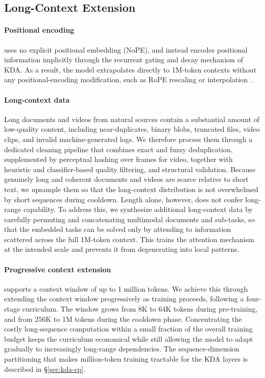 \subsection{Long-Context Extension}


\paragraph{Positional encoding}
 uses no explicit positional embedding (NoPE), and instead encodes positional information implicitly through the recurrent gating and decay mechanism of KDA.
As a result, the model extrapolates directly to 1M-token contexts without any positional-encoding modification, such as RoPE rescaling or interpolation~\citep{peng2023yarn}.

\paragraph{Long-context data}
Long documents and videos from natural sources contain a substantial amount of low-quality content, including near-duplicates, binary blobs, truncated files, video clips, and invalid machine-generated logs.
We therefore process them through a dedicated cleaning pipeline that combines exact and fuzzy deduplication, supplemented by perceptual hashing over frames for video, together with heuristic and classifier-based quality filtering, and structural validation.
Because genuinely long and coherent documents and videos are scarce relative to short text, we upsample them so that the long-context distribution is not overwhelmed by short sequences during cooldown. 
Length alone, however, does not confer long-range capability.
To address this, we synthesize additional long-context data by carefully permuting and concatenating multimodal documents and sub-tasks, so that the embedded tasks can be solved only by attending to information scattered across the full 1M-token context.
This trains the attention mechanism at the intended scale and prevents it from degenerating into local patterns.


\paragraph{Progressive context extension}
 supports a context window of up to 1 million tokens.
We achieve this through extending the context window progressively as training proceeds, following a four-stage curriculum.
The window grows from 8K to 64K tokens during pre-training, and from 256K to 1M tokens during the cooldown phase.
Concentrating the costly long-sequence computation within a small fraction of the overall training budget keeps the curriculum economical while still allowing the model to adapt gradually to increasingly long-range dependencies.
The sequence-dimension partitioning that makes million-token training tractable for the KDA layers is described in \S\ref{sec:kda-cp}.




